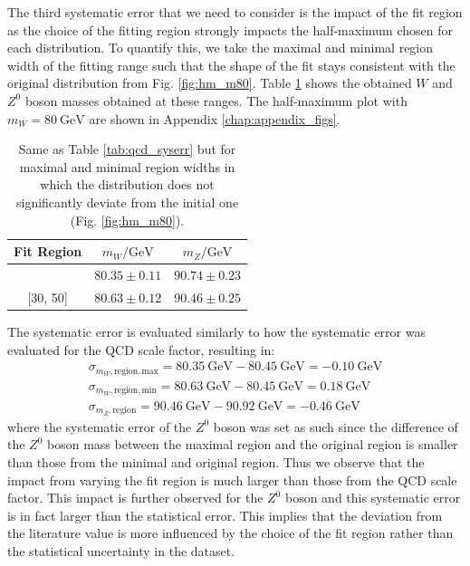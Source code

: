 \documentclass[a4paper]{report}
\numberwithin{equation}{section}
\begin{document}
The third systematic error that we need to consider is the impact of the fit region as the choice of the fitting region 
strongly impacts the half-maximum chosen for each distribution. To quantify this, we take the maximal and minimal 
region width of the fitting range such that the shape of the fit stays consistent with the original distribution from 
Fig. \ref{fig:hm_m80}. Table \ref{tab:fitregion_syserr} shows the obtained $W$ and $Z^0$ boson masses obtained at these ranges. 
The half-maximum plot with $m_W = \SI{80}{\giga\electronvolt}$ are shown in Appendix \ref{chap:appendix_figs}.

\begin{table}[htb!]
    \centering
    \begin{tabular}{|c|c|c|} \hline
    Fit Region &  $m_W / \si{\giga\electronvolt}$ & $m_Z / \si{\giga\electronvolt}$ \\ \hline
    [26, 65] & $80.35 \pm 0.11$ & $90.74 \pm 0.23$ \\ 
    {[}30, 50{]} & $80.63 \pm 0.12$ & $90.46 \pm 0.25$ \\ \hline 
    \end{tabular}
    \caption{Same as Table \ref{tab:qcd_syserr} but for maximal and minimal region widths in which the distribution 
    does not significantly deviate from the initial one (Fig. \ref{fig:hm_m80}).}
    \label{tab:fitregion_syserr}
\end{table}
The systematic error is evaluated similarly to how the systematic error was evaluated for the QCD scale factor, resulting in:
\begin{align}
    \sigma_{m_W, \mathrm{region, max}} = \SI{80.35}{\giga\electronvolt} - \SI{80.45}{\giga\electronvolt} = -\SI{0.10}{\giga\electronvolt} \\
    \sigma_{m_W, \mathrm{region, min}} = \SI{80.63}{\giga\electronvolt} - \SI{80.45}{\giga\electronvolt} = \SI{0.18}{\giga\electronvolt} \\
    \sigma_{m_Z, \mathrm{region}} = \SI{90.46}{\giga\electronvolt} - \SI{90.92}{\giga\electronvolt} = -\SI{0.46}{\giga\electronvolt} 
\end{align}
where the systematic error of the $Z^0$ boson was set as such since the difference of the $Z^0$ boson mass between the maximal
 region and the original region is smaller than those from the minimal and original region. Thus we observe that the impact from 
 varying the fit region is much larger than those from the QCD scale factor. This impact is further observed for the $Z^0$ boson and 
 this systematic error is in fact larger than the statistical error. This implies that the deviation from the literature value 
 is more influenced by the choice of the fit region rather than the statistical uncertainty in the dataset.
\end{document}
